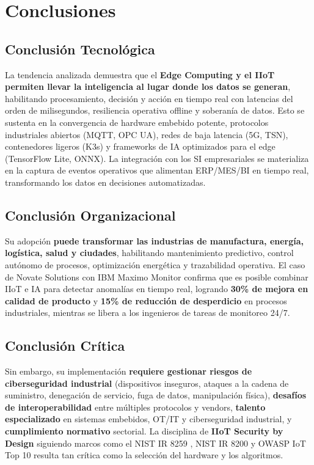 ﻿\documentclass[12pt,a4paper,oneside]{article}
\begin{document}
\section{Conclusiones}

\subsection{Conclusión Tecnológica}

La tendencia analizada demuestra que el \textbf{Edge Computing y el IIoT permiten llevar la inteligencia al lugar donde los datos se generan}, habilitando procesamiento, decisión y acción en tiempo real con latencias del orden de milisegundos, resiliencia operativa offline y soberanía de datos. Esto se sustenta en la convergencia de hardware embebido potente, protocolos industriales abiertos (MQTT, OPC UA), redes de baja latencia (5G, TSN), contenedores ligeros (K3s) y frameworks de IA optimizados para el edge (TensorFlow Lite, ONNX). La integración con los SI empresariales se materializa en la captura de eventos operativos que alimentan ERP/MES/BI en tiempo real, transformando los datos en decisiones automatizadas.

\subsection{Conclusión Organizacional}

Su adopción \textbf{puede transformar las industrias de manufactura, energía, logística, salud y ciudades}, habilitando mantenimiento predictivo, control autónomo de procesos, optimización energética y trazabilidad operativa. El caso de Novate Solutions con IBM Maximo Monitor \cite{ibmNovate} confirma que es posible combinar IIoT e IA para detectar anomalías en tiempo real, logrando \textbf{30\% de mejora en calidad de producto} y \textbf{15\% de reducción de desperdicio} en procesos industriales, mientras se libera a los ingenieros de tareas de monitoreo 24/7.

\subsection{Conclusión Crítica}

Sin embargo, su implementación \textbf{requiere gestionar riesgos de ciberseguridad industrial} (dispositivos inseguros, ataques a la cadena de suministro, denegación de servicio, fuga de datos, manipulación física), \textbf{desafíos de interoperabilidad} entre múltiples protocolos y vendors, \textbf{talento especializado} en sistemas embebidos, OT/IT y ciberseguridad industrial, y \textbf{cumplimiento normativo} sectorial. La disciplina de \textbf{IIoT Security by Design} siguiendo marcos como el NIST IR 8259 \cite{nistIR8259}, NIST IR 8200 \cite{nistIR8200} y OWASP IoT Top 10 \cite{owaspIoT2018} resulta tan crítica como la selección del hardware y los algoritmos.
\end{document}
